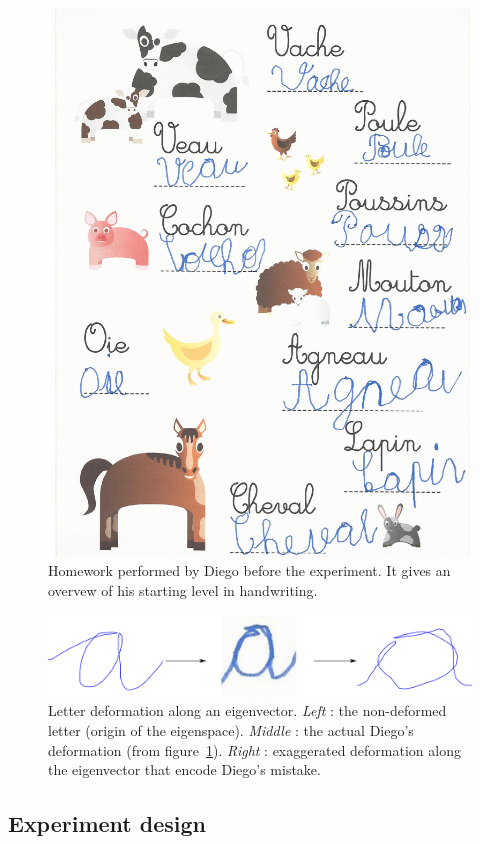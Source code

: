 \documentclass{sig-alternate}
\begin{document}
\begin{figure}
    \centering
    \includegraphics[width=0.9\linewidth]{diego_start}
    \caption{Homework performed by Diego before the experiment. It gives an
    overvew of his starting level in handwriting.}
    \label{fig:diego_start}
\end{figure}

\begin{figure}
    \centering
    \includegraphics[width=0.9\linewidth]{3a}
    \caption{Letter deformation along an eigenvector. \emph{Left} : the non-deformed
        letter (origin of the eigenspace). \emph{Middle} : the actual Diego's
        deformation (from figure~\ref{fig:diego_start}). \emph{Right} : exaggerated
deformation along the eigenvector that encode Diego's mistake.} 
    \label{fig:3a}
\end{figure}

\subsection{Experiment design}
\end{document}
